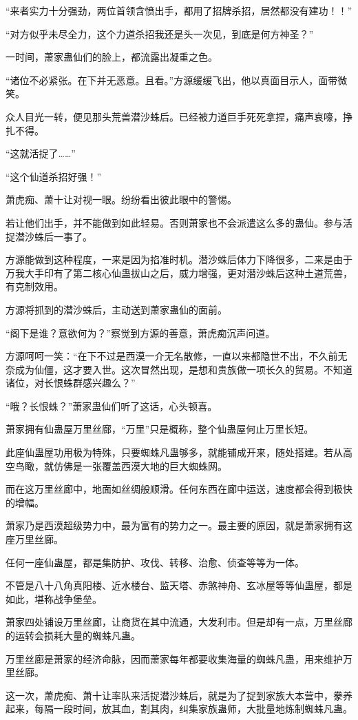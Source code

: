 \begin{this_body}
“来者实力十分强劲，两位首领含愤出手，都用了招牌杀招，居然都没有建功！！”

“对方似乎未尽全力，这个力道杀招我还是头一次见，到底是何方神圣？”

一时间，萧家蛊仙们的脸上，都流露出凝重之色。

“诸位不必紧张。在下并无恶意。且看。”方源缓缓飞出，他以真面目示人，面带微笑。

众人目光一转，便见那头荒兽潜沙蛛后。已经被力道巨手死死拿捏，痛声哀嚎，挣扎不得。

“这就活捉了……”

“这个仙道杀招好强！”

萧虎痴、萧十让对视一眼。纷纷看出彼此眼中的警惕。

若让他们出手，并不能做到如此轻易。否则萧家也不会派遣这么多的蛊仙。参与活捉潜沙蛛后一事了。

方源能做到这种程度，一来是因为掐准时机。潜沙蛛后体力下降很多，二来是由于万我大手印有了第二核心仙蛊拔山之后，威力增强，更对潜沙蛛后这种土道荒兽，有克制效用。

方源将抓到的潜沙蛛后，主动送到萧家蛊仙的面前。

“阁下是谁？意欲何为？”察觉到方源的善意，萧虎痴沉声问道。

方源呵呵一笑：“在下不过是西漠一介无名散修，一直以来都隐世不出，不久前无奈成为仙僵，这才要入世。这次冒然出现，是想和贵族做一项长久的贸易。不知道诸位，对长恨蛛群感兴趣么？”

“哦？长恨蛛？”萧家蛊仙们听了这话，心头顿喜。

萧家拥有仙蛊屋万里丝廊，“万里”只是概称，整个仙蛊屋何止万里长短。

此座仙蛊屋功用极为特殊，只要蜘蛛凡蛊够多，就能铺成开来，随处搭建。若从高空鸟瞰，就仿佛是一张覆盖西漠大地的巨大蜘蛛网。

而在这万里丝廊中，地面如丝绸般顺滑。任何东西在廊中运送，速度都会得到极快的增幅。

萧家乃是西漠超级势力中，最为富有的势力之一。最主要的原因，就是萧家拥有这座万里丝廊。

任何一座仙蛊屋，都是集防护、攻伐、转移、治愈、侦查等等为一体。

不管是八十八角真阳楼、近水楼台、监天塔、赤煞神舟、玄冰屋等等仙蛊屋，都是如此，堪称战争堡垒。

萧家四处铺设万里丝廊，让商货在其中流通，大发利市。但是却有一点，万里丝廊的运转会损耗大量的蜘蛛凡蛊。

万里丝廊是萧家的经济命脉，因而萧家每年都要收集海量的蜘蛛凡蛊，用来维护万里丝廊。

这一次，萧虎痴、萧十让率队来活捉潜沙蛛后，就是为了捉到家族大本营中，豢养起来，每隔一段时间，放其血，割其肉，纠集家族蛊师，大批量地炼制蜘蛛凡蛊。


\end{this_body}
